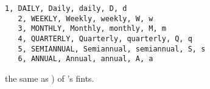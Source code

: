 \begin{lstlisting}[numbers=none,backgroundcolor=\color{white}]
   1, DAILY, Daily, daily, D, d
   2, WEEKLY, Weekly, weekly, W, w
   3, MONTHLY, Monthly, monthly, M, m
   4, QUARTERLY, Quarterly, quarterly, Q, q							
   5, SEMIANNUAL, Semiannual, semiannual, S, s						
   6, ANNUAL, Annual, annual, A, a
\end{lstlisting}
\vspace*{-.3cm}
the same as ) of \matlab{}'s fints.
